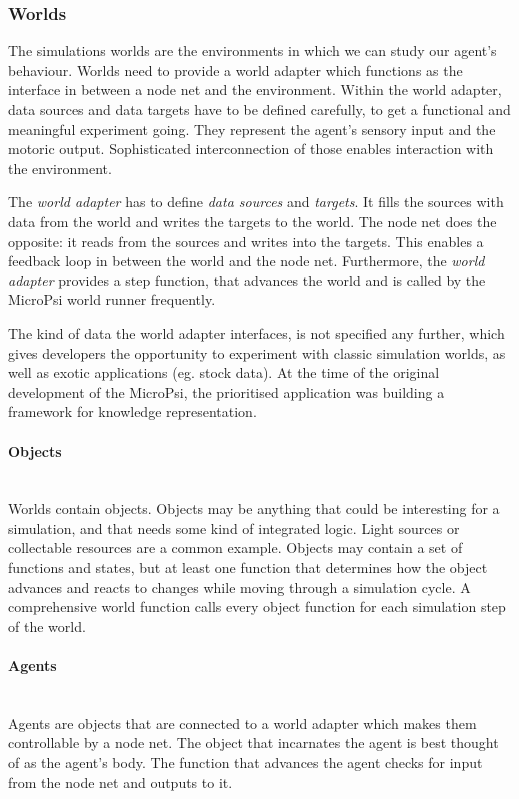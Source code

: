         \subsubsection{Worlds}
        \label{microPsiWorld}
The simulations worlds are the environments in which we can study our agent's behaviour. Worlds need to provide a world adapter which functions as the interface in between a node net and the environment. Within the world adapter, data sources and data targets have to be defined carefully, to get a functional and meaningful experiment going. They represent the agent's sensory input and the motoric output. Sophisticated interconnection of those enables interaction with the environment.

The \emph{world adapter} has to define \emph{data sources} and \emph{targets}. It fills the sources with data from the world and writes the targets to the world. The node net does the opposite: it reads from the sources and writes into the targets. This enables a feedback loop in between the world and the node net. Furthermore, the \emph{world adapter} provides a step function, that advances the world and is called by the MicroPsi world runner frequently.


The kind of data the world adapter interfaces, is not specified any further, which gives developers the opportunity to experiment with classic simulation worlds, as well as exotic applications (eg. stock data). At the time of the original development of the MicroPsi, the prioritised application was building a framework for knowledge representation.

            \paragraph{Objects}$\;$ \\
Worlds contain objects. Objects may be anything that could be interesting for a simulation, and that needs some kind of integrated logic. Light sources or collectable resources are a common example. Objects may contain a set of functions and states, but at least one function that determines how the object advances and reacts to changes while moving through a simulation cycle. A comprehensive world function calls every object function for each simulation step of the world.

            \paragraph{Agents}$\;$ \\
Agents are objects that are connected to a world adapter which makes them controllable by a node net. The object that incarnates the agent is best thought of as the agent's body. The function that advances the agent checks for input from the node net and outputs to it.
        
